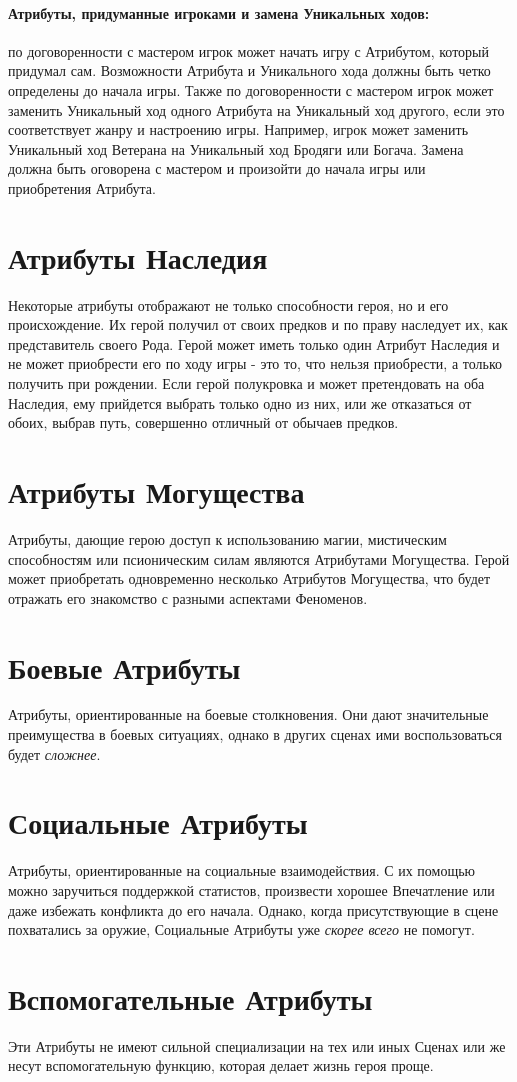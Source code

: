 \paragraph{Атрибуты, придуманные игроками и замена Уникальных ходов:} по договоренности с мастером игрок может начать игру с Атрибутом, который придумал сам. Возможности Атрибута и Уникального хода должны быть четко определены до начала игры. Также по договоренности с мастером игрок может заменить Уникальный ход одного Атрибута на Уникальный ход другого, если это соответствует жанру и настроению игры. Например, игрок может заменить Уникальный ход Ветерана на Уникальный ход Бродяги или Богача. Замена должна быть оговорена с мастером и произойти до начала игры или приобретения Атрибута.

\section{Атрибуты Наследия}
Некоторые атрибуты отображают не только способности героя, но и его происхождение. Их герой получил от своих предков и по праву наследует их, как представитель своего Рода. Герой может иметь только один Атрибут Наследия и не может приобрести его по ходу игры - это то, что нельзя приобрести, а только получить при рождении. Если герой полукровка и может претендовать на оба Наследия, ему прийдется выбрать только одно из них, или же отказаться от обоих, выбрав путь, совершенно отличный от обычаев предков.

\section{Атрибуты Могущества}
Атрибуты, дающие герою доступ к использованию магии, мистическим способностям или псионическим силам являются Атрибутами Могущества. Герой может приобретать одновременно несколько Атрибутов Могущества, что будет отражать его знакомство с разными аспектами Феноменов.

\section{Боевые Атрибуты}
Атрибуты, ориентированные на боевые столкновения. Они дают значительные преимущества в боевых ситуациях, однако в других сценах ими воспользоваться будет \textit{сложнее}.

\section{Социальные Атрибуты}
Атрибуты, ориентированные на социальные взаимодействия. С их помощью можно заручиться поддержкой статистов, произвести хорошее Впечатление или даже избежать конфликта до его начала. Однако, когда присутствующие в сцене похватались за оружие, Социальные Атрибуты уже \textit{скорее всего} не помогут.

\section{Вспомогательные Атрибуты}
Эти Атрибуты не имеют сильной специализации на тех или иных Сценах или же несут вспомогательную функцию, которая делает жизнь героя проще.
